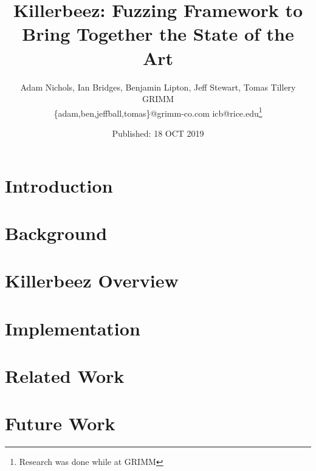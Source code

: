 \documentclass[twocolumn]{article}
\title{Killerbeez: Fuzzing Framework to Bring Together the State of the Art}
\author{Adam Nichols, Ian Bridges, Benjamin Lipton, Jeff Stewart, Tomas Tillery \\
GRIMM\\
\{adam,ben,jeffball,tomas\}@grimm-co.com icb@rice.edu\footnote{Research was done while at GRIMM}\\
}
\date{Published: 18 OCT 2019}
\begin{document}
\maketitle




\section{Introduction} \label{Introduction}


\section{Background} \label{Background}


\section{Killerbeez Overview} \label{Killerbeez Overview}


\section{Implementation} \label{Implementation}



\section{Related Work} \label{Related Work}


\section{Future Work} \label{Future Work}

\end{document}
